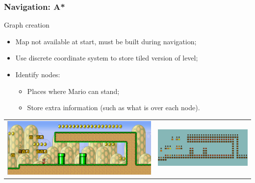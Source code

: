 \documentclass{beamer}
\begin{document}
\begin{frame}{}
	\frametitle{Navigation: A*}
	\begin{block}{Graph creation}
		\begin{itemize}
			\item Map not available at start, must be built during navigation;
			\item Use discrete coordinate system to store tiled version of level;
			\item Identify nodes:
			\begin{itemize}
				\item Places where Mario can stand;
				\item Store extra information (such as what is over each node).
			\end{itemize}
		\end{itemize}
		\begin{center}
			\begin{tabular}{cc}
			\includegraphics[width=.45\textwidth]{trap}&
			\includegraphics[width=.45\textwidth]{trapNodes}\\
			\end{tabular}
		\end{center}
	\end{block}
	\vfill
\end{frame}
\end{document}
